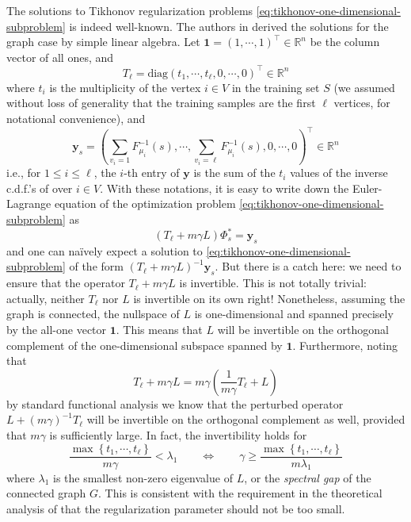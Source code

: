 \documentclass[letterpaper]{article} %
\begin{document}
The solutions to Tikhonov regularization problems \eqref{eq:tikhonov-one-dimensional-subproblem} is indeed well-known. The authors in \cite{Belkin2004} derived the solutions for the graph case by simple linear algebra. Let $\mathbf{1}=\left( 1,\cdots,1 \right)^{\top}\in\mathbb{R}^n$ be the column vector of all ones, and
$$T_\ell=\mathrm{diag}\left( t_1,\cdots,t_{\ell},0,\cdots,0 \right)^{\top}\in\mathbb{R}^n$$
where $t_i$ is the multiplicity of the vertex $i\in V$ in the training set $S$ (we assumed without loss of generality that the training samples are the first $\ell$ vertices, for notational convenience), and
\begin{equation}
  \label{eq:y-defn}
  \mathbf{y}_s=\left( \sum_{v_{i}=1}F_{\mu_i}^{-1}\left( s \right),\cdots,\sum_{v_i=\ell}F_{\mu_i}^{-1}\left( s \right),0,\cdots,0 \right)^{\top}\in\mathbb{R}^n
\end{equation}
i.e., for $1\leq i\leq \ell$, the $i$-th entry of $\mathbf{y}$ is the sum of the $t_i$ values of the inverse c.d.f.'s of over $i\in V$. With these notations, it is easy to write down the Euler-Lagrange equation of the optimization problem \eqref{eq:tikhonov-one-dimensional-subproblem} as
\begin{equation}
  \label{eq:tikhonov-one-dimensional-subproblem-euler-lagrange}
  \left( T_{\ell}+m\gamma L \right)\Phi_s^{*}=\mathbf{y}_s
\end{equation}
and one can na\"ively expect a solution to \eqref{eq:tikhonov-one-dimensional-subproblem} of the form $\left( T_{\ell}+m\gamma L \right)^{-1}\mathbf{y}_s$. But there is a catch here: we need to ensure that the operator $T_{\ell}+m\gamma L$ is invertible. This is not totally trivial: actually, neither $T_{\ell}$ nor $L$ is invertible on its own right! Nonetheless, assuming the graph is connected, the nullspace of $L$ is one-dimensional and spanned precisely by the all-one vector $\mathbf{1}$. This means that $L$ will be invertible on the orthogonal complement of the one-dimensional subspace spanned by $\mathbf{1}$. Furthermore, noting that
\begin{equation}
  \label{eq:standard-functional-analysis}
  T_{\ell}+m\gamma L=m\gamma \left( \frac{1}{m\gamma}T_{\ell}+L \right)
\end{equation}
by standard functional analysis we know that the perturbed operator $L+\left( m\gamma \right)^{-1}T_{\ell}$ will be invertible on the orthogonal complement as well, provided that $m\gamma$ is sufficiently large. In fact, the invertibility holds for
\begin{equation*}
  \frac{\max \left\{ t_1,\cdots,t_{\ell} \right\}}{m\gamma}<\lambda_1\qquad\Leftrightarrow\qquad \gamma\geq \frac{\max \left\{ t_1,\cdots,t_{\ell} \right\}}{m\lambda_1}
\end{equation*}
where $\lambda_1$ is the smallest non-zero eigenvalue of $L$, or the \emph{spectral gap} of the connected graph $G$. This is consistent with the requirement in the theoretical analysis of \cite{Belkin2004} that the regularization parameter should not be too small.
\end{document}
